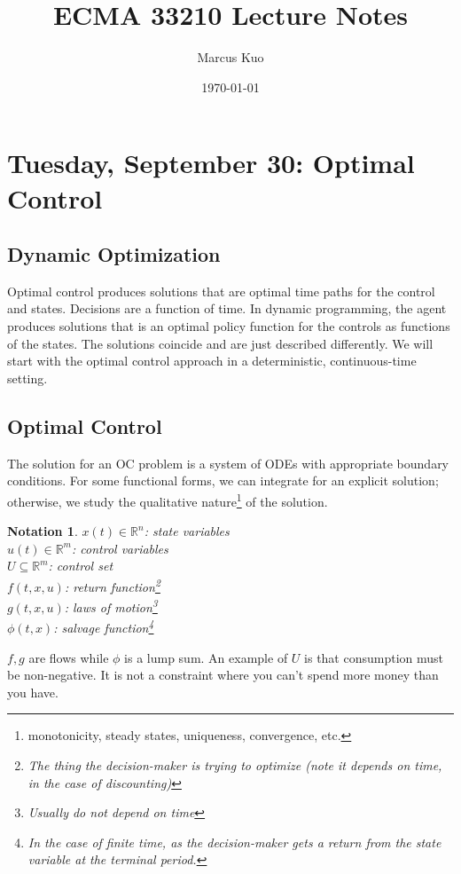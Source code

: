 \documentclass{tufte-handout}
\title{ECMA 33210 Lecture Notes}
\author{Marcus Kuo}
\date{\today} %
\newcommand*\R{\mathbb{R}}
\newtheorem{notation}[thm]{Notation}
\theoremstyle{definition}
\begin{document}
\maketitle
\tableofcontents

\newpage

\section{Tuesday, September 30: Optimal Control}\label{}
\subsection{Dynamic Optimization}

Optimal control produces solutions that are optimal time paths for the control and states. Decisions are a function of time. In dynamic programming, the agent produces solutions that is an optimal policy function for the controls as functions of the states.
The solutions coincide and are just described differently. We will start with the optimal control approach in a deterministic, continuous-time setting.

\subsection{Optimal Control}

The solution for an OC problem is a system of ODEs with appropriate boundary conditions. For some functional forms, we can integrate for an explicit solution; otherwise, we study the qualitative nature\footnote{monotonicity, steady states, uniqueness, convergence, etc.} of the solution.

\begin{notation}
	$x(t) \in \R^n$: state variables \\
	$u(t) \in \R^m$: control variables \\
	$U \subseteq \R^m$: control set \\
	$f(t,x,u)$: return function\footnote{The thing the decision-maker is trying to optimize (note it depends on time, in the case of discounting)} \\
	$g(t,x,u)$: laws of motion\footnote{Usually do not depend on time} \\
	$\phi(t,x)$: salvage function\footnote{In the case of finite time, as the decision-maker gets a return from the state variable at the terminal period.}
\end{notation}

$f,g$ are flows while $\phi$ is a lump sum. An example of $U$ is that consumption must be non-negative. It is not a constraint where you can't spend more money than you have.
\end{document}
